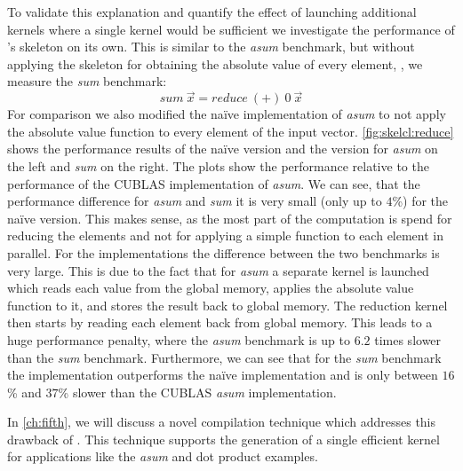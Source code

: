 To validate this explanation and quantify the effect of launching additional kernels where a single kernel would be sufficient we investigate the performance of \SkelCL's \reduce skeleton on its own.
This is similar to the \emph{asum} benchmark, but without applying the \map skeleton for obtaining the absolute value of every element, \ie, we measure the \emph{sum} benchmark:
\begin{equation}
  sum\ \vec{x} = reduce\ (+)\ 0\ \vec{x}
  \label{eq:sum}
\end{equation}
For comparison we also modified the na{\"i}ve \OpenCL implementation of \emph{asum} to not apply the absolute value function to every element of the input vector.
\autoref{fig:skelcl:reduce} shows the performance results of the na{\"i}ve \OpenCL version and the \SkelCL version for \emph{asum} on the left and \emph{sum} on the right.
The plots show the performance relative to the performance of the CUBLAS implementation of \emph{asum}.
We can see, that the performance difference for \emph{asum} and \emph{sum} it is very small (only up to $4$\%) for the na{\"i}ve \OpenCL version.
This makes sense, as the most part of the computation is spend for reducing the elements and not for applying a simple function to each element in parallel.
For the \SkelCL implementations the difference between the two benchmarks is very large.
This is due to the fact that for \emph{asum} a separate \OpenCL kernel is launched which reads each value from the global memory, applies the absolute value function to it, and stores the result back to global memory.
The reduction kernel then starts by reading each element back from global memory.
This leads to a huge performance penalty, where the \emph{asum} benchmark is up to $6.2$ times slower than the \emph{sum} benchmark.
Furthermore, we can see that for the \emph{sum} benchmark the \SkelCL implementation outperforms the na{\"i}ve \OpenCL implementation and is only between $16$\% and $37$\% slower than the CUBLAS \emph{asum} implementation.

In \autoref{ch:fifth}, we will discuss a novel compilation technique which addresses this drawback of \SkelCL.
This technique supports the generation of a single efficient \OpenCL kernel for applications like the \emph{asum} and dot product examples.

